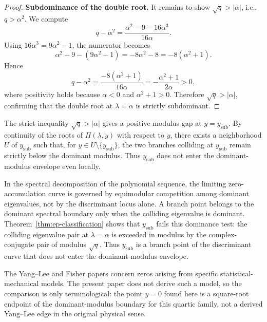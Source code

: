 \begin{proof}
\medskip
\noindent\textbf{Subdominance of the double root.}
It remains to show $\sqrt{q} > |\alpha|$, i.e., $q > \alpha^2$.
We compute
\begin{equation}\label{eq:q-minus-alpha-sq}
q - \alpha^2 = \frac{\alpha^2 - 9 - 16\alpha^3}{16\alpha}.
\end{equation}
Using $16\alpha^3 = 9\alpha^2 - 1$, the numerator becomes
\[
\alpha^2 - 9 - (9\alpha^2 - 1) = -8\alpha^2 - 8 = -8(\alpha^2 + 1).
\]
Hence
\[
q - \alpha^2 = \frac{-8(\alpha^2 + 1)}{16\alpha} = -\frac{\alpha^2 + 1}{2\alpha} > 0,
\]
where positivity holds because $\alpha < 0$ and $\alpha^2 + 1 > 0$.
Therefore $\sqrt{q} > |\alpha|$, confirming that the double root at $\lambda = \alpha$ is strictly subdominant.
\end{proof}

\begin{remark}\label{rem:ysub-local-gap}
The strict inequality $\sqrt{q}>|\alpha|$ gives a positive modulus gap at \(y=y_{\mathrm{sub}}\).
By continuity of the roots of \(\Pi(\lambda,y)\) with respect to \(y\), there exists a neighborhood \(U\) of \(y_{\mathrm{sub}}\) such that, for \(y\in U\setminus\{y_{\mathrm{sub}}\}\), the two branches colliding at \(y_{\mathrm{sub}}\) remain strictly below the dominant modulus.
Thus \(y_{\mathrm{sub}}\) does not enter the dominant-modulus envelope even locally.
\end{remark}

\begin{remark}\label{rem:ep-physical}
In the spectral decomposition of the polynomial sequence, the limiting zero-accumulation curve is governed by equimodular competition among dominant eigenvalues, not by the discriminant locus alone.
A branch point belongs to the dominant spectral boundary only when the colliding eigenvalue is dominant.
Theorem~\ref{thm:ep-classification} shows that $y_{\mathrm{sub}}$ fails this dominance test: the colliding eigenvalue pair at $\lambda = \alpha$ is exceeded in modulus by the complex-conjugate pair of modulus $\sqrt{q}$.
Thus $y_{\mathrm{sub}}$ is a branch point of the discriminant curve that does not enter the dominant-modulus envelope.
\end{remark}

\begin{remark}\label{rem:yang-lee-distinction}
The Yang--Lee and Fisher papers \cite{YangLee1952I,LeeYang1952II,Fisher1978,KortmanGriffiths1971} concern zeros arising from specific statistical-mechanical models.
The present paper does not derive such a model, so the comparison is only terminological: the point $y=0$ found here is a square-root endpoint of the dominant-modulus boundary for this quartic family, not a derived Yang--Lee edge in the original physical sense.
\end{remark}

